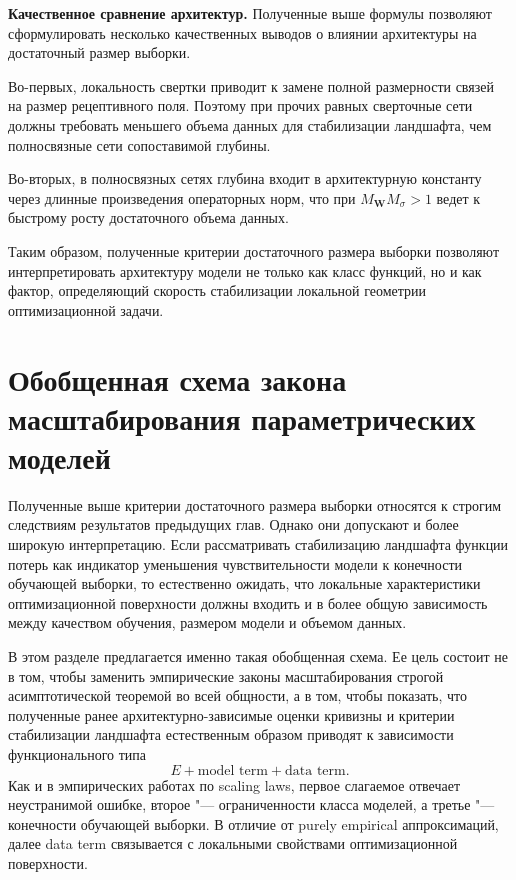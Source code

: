 \textbf{Качественное сравнение архитектур.} Полученные выше формулы позволяют сформулировать несколько качественных выводов о влиянии архитектуры на достаточный размер выборки.

Во-первых, локальность свертки приводит к замене полной размерности связей на размер рецептивного поля. Поэтому при прочих равных сверточные сети должны требовать меньшего объема данных для стабилизации ландшафта, чем полносвязные сети сопоставимой глубины.

Во-вторых, в полносвязных сетях глубина входит в архитектурную константу через длинные произведения операторных норм, что при $M_{\mathbf W}M_{\sigma}>1$ ведет к быстрому росту достаточного объема данных.


Таким образом, полученные критерии достаточного размера выборки позволяют интерпретировать архитектуру модели не только как класс функций, но и как фактор, определяющий скорость стабилизации локальной геометрии оптимизационной задачи.

\section{Обобщенная схема закона масштабирования параметрических моделей}\label{sec:scaling-laws-main}

Полученные выше критерии достаточного размера выборки относятся к строгим следствиям результатов предыдущих глав. Однако они допускают и более широкую интерпретацию. Если рассматривать стабилизацию ландшафта функции потерь как индикатор уменьшения чувствительности модели к конечности обучающей выборки, то естественно ожидать, что локальные характеристики оптимизационной поверхности должны входить и в более общую зависимость между качеством обучения, размером модели и объемом данных.

В этом разделе предлагается именно такая обобщенная схема. Ее цель состоит не в том, чтобы заменить эмпирические законы масштабирования строгой асимптотической теоремой во всей общности, а в том, чтобы показать, что полученные ранее архитектурно-зависимые оценки кривизны и критерии стабилизации ландшафта естественным образом приводят к зависимости функционального типа
\begin{equation}
    \label{eq:scaling-generic-form}
    E + \text{model term} + \text{data term}.
\end{equation}
Как и в эмпирических работах по scaling laws, первое слагаемое отвечает неустранимой ошибке, второе "--- ограниченности класса моделей, а третье "--- конечности обучающей выборки. В отличие от purely empirical аппроксимаций, далее data term связывается с локальными свойствами оптимизационной поверхности.

